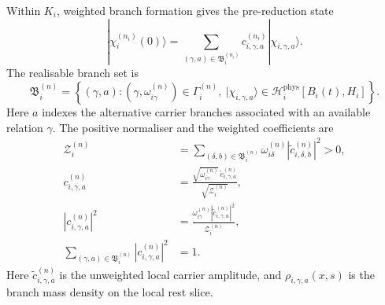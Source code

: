 Within $K_i$, weighted branch formation gives the pre-reduction state
\begin{equation}
  |\chi_i^{(n_i)}(0)\rangle
  =\sum_{(\gamma,a)\in\mathfrak B_i^{(n_i)}}
    c_{i,\gamma,a}^{(n_i)}|\chi_{i,\gamma,a}\rangle.
  \label{eq:conditioned_branch_state}
\end{equation}
The realisable branch set is
\begin{equation}
  \mathfrak B_i^{(n)}=
  \left\{(\gamma,a):
  (\gamma,\omega_{i\gamma}^{(n)})\in\Gamma_i^{(n)},\ 
  |\chi_{i,\gamma,a}\rangle\in
  \mathcal H_i^{\mathrm{phys}}[B_i(t),H_i]\right\}.
  \label{eq:realisable_branch_set}
\end{equation}
\noindent Here $a$ indexes the alternative carrier branches associated with an
available relation $\gamma$.
The positive normaliser and the weighted coefficients are
\begin{equation}
\begin{aligned}
  \mathcal Z_i^{(n)}
    &=\sum_{(\delta,b)\in\mathfrak B_i^{(n)}}
      \omega_{i\delta}^{(n)}
      \left|\widetilde c_{i,\delta,b}^{(n)}\right|^2>0,\\
  c_{i,\gamma,a}^{(n)}
    &=\frac{\sqrt{\omega_{i\gamma}^{(n)}}\,
      \widetilde c_{i,\gamma,a}^{(n)}}
      {\sqrt{\mathcal Z_i^{(n)}}},\\
  \left|c_{i,\gamma,a}^{(n)}\right|^2
    &=\frac{\omega_{i\gamma}^{(n)}
      \left|\widetilde c_{i,\gamma,a}^{(n)}\right|^2}
      {\mathcal Z_i^{(n)}},\\
  \sum_{(\gamma,a)\in\mathfrak B_i^{(n)}}
    \left|c_{i,\gamma,a}^{(n)}\right|^2&=1.
\end{aligned}
  \label{eq:weighted_branch_coefficients}
\end{equation}
\noindent Here $\widetilde c_{i,\gamma,a}^{(n)}$ is the unweighted local carrier
amplitude, and $\rho_{i,\gamma,a}(x,s)$ is the branch mass density on the local rest
slice.

